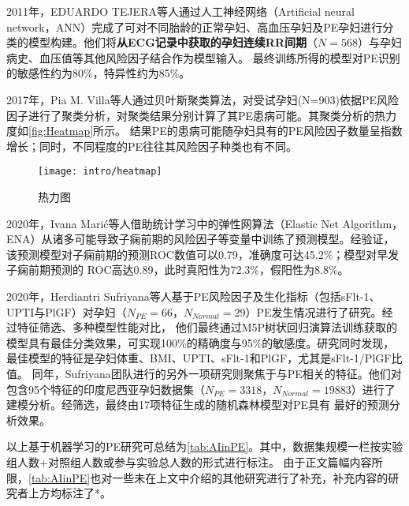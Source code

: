 2011年，EDUARDO TEJERA等人\cite{Tejera2011}通过人工神经网络（Artificial neural network，ANN）完成了可对不同胎龄的正常孕妇、高血压孕妇及PE孕妇进行分类的模型构建。他们将\textbf{从ECG记录中获取的孕妇连续RR间期}（$N=568$）与孕妇病史、血压值等其他风险因子结合作为模型输入。
最终训练所得的模型对PE识别的敏感性约为80\%，特异性约为85\%。

2017年，Pia M. Villa等人\cite{Villa2017}通过贝叶斯聚类算法，对受试孕妇(N=903)依据PE风险因子进行了聚类分析，对聚类结果分别计算了其PE患病可能。其聚类分析的热力度如\autoref{fig:Heatmap}所示。
结果PE的患病可能随孕妇具有的PE风险因子数量呈指数增长；同时，不同程度的PE往往其风险因子种类也有不同。
\begin{figure}[htbp]
    \centering
    \texttt{[image: intro/heatmap]}
    \caption{\label{fig:Heatmap}热力图}
\end{figure}

2020年，Ivana Mari{\'{c}}\cite{Maric2020}等人借助统计学习中的弹性网算法（Elastic Net Algorithm，ENA）从诸多可能导致子痫前期的风险因子等变量中训练了预测模型。经验证，该预测模型对子痫前期的预测ROC数值可以0.79，准确度可达45.2\%；模型对早发子痫前期预测的
ROC高达0.89，此时真阳性为72.3\%，假阳性为8.8\%。

2020年，Herdiantri Sufriyana等人\cite{Sufriyana2020-1}基于PE风险因子及生化指标（包括sFlt-1、UPTI与PlGF）对孕妇（$N_{PE}=66$，$N_{Normal}=29$）PE发生情况进行了研究。经过特征筛选、多种模型性能对比，
他们最终通过M5P树状回归演算法训练获取的模型具有最佳分类效果，可实现100\%的精确度与95\%的敏感度。研究同时发现，最佳模型的特征是孕妇体重、BMI、UPTI、sFlt-1和PlGF，尤其是sFlt-1/PlGF比值。
同年，Sufriyana团队进行的另外一项研究\cite{Sufriyana2020}则聚焦于与PE相关的特征。他们对包含95个特征的印度尼西亚孕妇数据集（$N_{PE}=3318$，$N_{Normal}=19883$）进行了建模分析。经筛选，最终由17项特征生成的随机森林模型对PE具有
最好的预测分析效果。

以上基于机器学习的PE研究可总结为\autoref{tab:AIinPE}。其中，数据集规模一栏按实验组人数+对照组人数或参与实验总人数的形式进行标注。
由于正文篇幅内容所限，\autoref{tab:AIinPE}也对一些未在上文中介绍的其他研究进行了补充，补充内容的研究者上方均标注了*。

